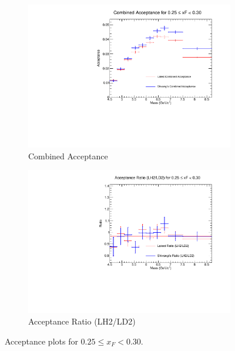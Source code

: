 \documentclass[11pt]{article}
\begin{document}
\begin{figure}[p]
\begin{subfigure}[b]{0.48\textwidth}
       \includegraphics[width=\linewidth]{./acceptancePlots/Combined_acceptance_xF_bin_5.pdf}
       \caption{Combined Acceptance}
    \end{subfigure}\hfill
    \begin{subfigure}[b]{0.48\textwidth}
       \includegraphics[width=\linewidth]{./acceptancePlots/Acceptance_ratio_xF_bin_5.pdf}
       \caption{Acceptance Ratio (LH2/LD2)}
    \end{subfigure}
    \caption{Acceptance plots for $0.25 \le x_F < 0.30$.}
\end{figure}
\end{document}
